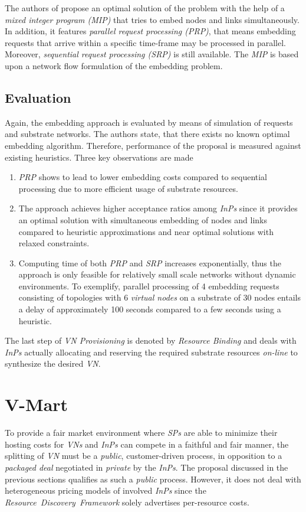 \documentclass[prodmode,acmtomccap]{acmlarge}
\begin{document}
The authors of  propose an optimal solution of the problem with the help of a \emph{mixed integer program (MIP)} that tries to embed nodes and links simultaneously. In addition,
it features \emph{parallel request processing (PRP)}, that means embedding requests that arrive within a specific time-frame may be processed in parallel. Moreover,
\emph{sequential request processing (SRP)} is still available.
The \emph{MIP} is based upon a network flow formulation of the embedding problem.

\subsection{Evaluation}
Again, the embedding approach is evaluated by means of simulation of requests and substrate networks. The authors state, that there exists no known optimal embedding algorithm. Therefore, performance of the proposal
is measured against existing heuristics. Three key observations are made

\begin{enumerate}
	\item \emph{PRP} shows to lead to lower embedding costs compared to sequential processing due to more efficient usage of substrate resources.
	\item  The approach achieves higher acceptance ratios among \emph{InPs} since it provides an optimal solution with simultaneous embedding of nodes and links
		compared to heuristic approximations and near optimal solutions with relaxed constraints.
	\item Computing time of both \emph{PRP} and \emph{SRP} increases exponentially, thus the approach is only feasible for relatively small scale networks without dynamic environments.
		To exemplify, parallel processing of 4 embedding requests consisting of topologies with 6 \emph{virtual nodes} on a substrate of 30 nodes entails a delay of approximately 100 seconds
		compared to a few seconds using a heuristic.
\end{enumerate}

The last step of \emph{VN Provisioning} is denoted by \emph{Resource Binding} and deals with \emph{InPs} actually allocating and reserving the required substrate resources \emph{on-line} to synthesize
the desired \emph{VN}.

\section{V-Mart}
\label{sec:vmart}
To provide a fair market environment where \emph{SPs} are able to minimize their hosting costs for \emph{VNs} and \emph{InPs} can compete in a faithful and fair manner,
the splitting of \emph{VN} must be a \emph{public}, customer-driven process, in opposition to a \emph{packaged deal} negotiated in \emph{private} by the \emph{InPs}.
The proposal discussed in the previous sections qualifies as such a \emph{public} process. However, it does not deal with heterogeneous pricing models of involved \emph{InPs} since
the \emph{Resource~Discovery~Framework} solely advertises per-resource costs.
\end{document}

